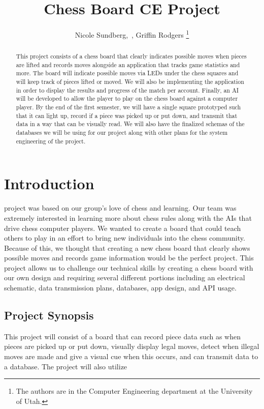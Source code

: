 \documentclass[11pt,journal]{IEEEtran}
\begin{document}
\title{Chess Board CE Project}

\author{Nicole Sundberg,~, Griffin Rodgers
  \thanks{The authors are in the Computer Engineering
    department at the University of Utah.}
}
\maketitle


\begin{abstract}
This project consists of a chess board that clearly indicates possible moves when pieces are lifted and records moves alongside an application that tracks game statistics and more. The board will indicate possible moves via LEDs under the chess squares and will keep track of pieces lifted or moved. We will also be implementing the application in order to display the results and progress of the match per account. Finally, an AI will be developed to allow the player to play on the chess board against a computer player. By the end of the first semester, we will have a single square prototyped such that it can light up, record if a piece was picked up or put down, and transmit that data in a way that can be visually read. We will also have the finalized schemas of the databases we will be using for our project along with other plans for the system engineering of the project.
\end{abstract}

\section{Introduction}

 project was based on our group's love of chess and learning. Our team was extremely interested in learning more about chess rules along with the AIs that drive chess computer players. We wanted to create a board that could teach others to play in an effort to bring new individuals into the chess community. Because of this, we thought that creating a new chess board that clearly shows possible moves and records game information would be the perfect project. This project allows us to challenge our technical skills by creating a chess board with our own design and requiring several different portions including an electrical schematic, data transmission plans, databases, app design, and API usage. 

\subsection{Project Synopsis}
This project will consist of a board that can record piece data such as when pieces are picked up or put down, visually display legal moves, detect when illegal moves are made and give a visual cue when this occurs, and can transmit data to a database. The project will also utilize 
\end{document}
